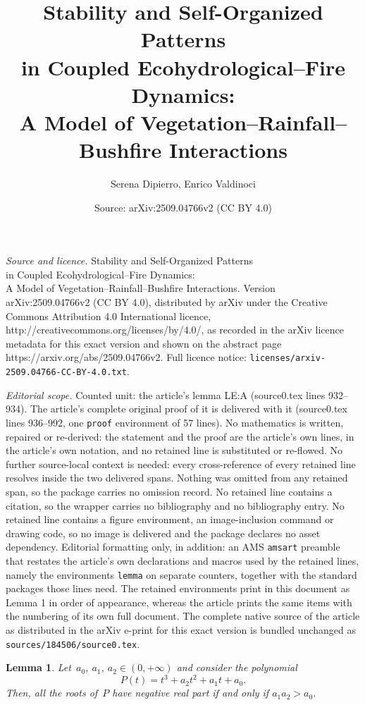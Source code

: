 \documentclass[10pt,a4paper]{amsart}
\title{Stability and Self-Organized Patterns \\ in Coupled Ecohydrological--Fire Dynamics: \\ A Model of Vegetation--Rainfall--Bushfire Interactions}
\author{Serena Dipierro, Enrico Valdinoci}
\date{Source: arXiv:2509.04766v2 (CC BY 4.0)}
\newtheorem{lemma}{Lemma}
\begin{document}
\maketitle

\noindent\emph{Source and licence.} Stability and Self-Organized Patterns \\ in Coupled Ecohydrological--Fire Dynamics: \\ A Model of Vegetation--Rainfall--Bushfire Interactions. Version arXiv:2509.04766v2 (CC BY 4.0), distributed by arXiv under the Creative Commons Attribution 4.0 International licence, http://creativecommons.org/licenses/by/4.0/, as recorded in the arXiv licence metadata for this exact version and shown on the abstract page https://arxiv.org/abs/2509.04766v2. Full licence notice: \texttt{licenses/arxiv-2509.04766-CC-BY-4.0.txt}.\par\smallskip

\noindent\textit{Editorial scope.} Counted unit: the article's lemma LE:A (source0.tex lines 932--934). The article's complete original proof of it is delivered with it (source0.tex lines 936--992, one \texttt{proof} environment of 57 lines). No mathematics is written, repaired or re-derived: the statement and the proof are the article's own lines, in the article's own notation, and no retained line is substituted or re-flowed.  No further source-local context is needed: every cross-reference of every retained line resolves inside the two delivered spans.  Nothing was omitted from any retained span, so the package carries no omission record.  No retained line contains a citation, so the wrapper carries no bibliography and no bibliography entry.  No retained line contains a figure environment, an image-inclusion command or drawing code, so no image is delivered and the package declares no asset dependency.  Editorial formatting only, in addition: an AMS \texttt{amsart} preamble that restates the article's own declarations and macros used by the retained lines, namely the environments \texttt{lemma} on separate counters, together with the standard packages those lines need.  The retained environments print in this document as Lemma 1 in order of appearance, whereas the article prints the same items with the numbering of its own full document.  The complete native source of the article as distributed in the arXiv e-print for this exact version is bundled unchanged as \texttt{sources/184506/source0.tex}.
\begin{lemma}\label{LE:A}
Let~$a_0$, $a_1$, $a_2\in(0,+\infty)$ and consider the polynomial $$P(t) = t^3 + a_2 t^2 + a_1 t + a_0.$$ Then, all the roots of~$P$ have negative real part if and only if $a_1 a_2 > a_0 $.
\end{lemma}
\end{document}
